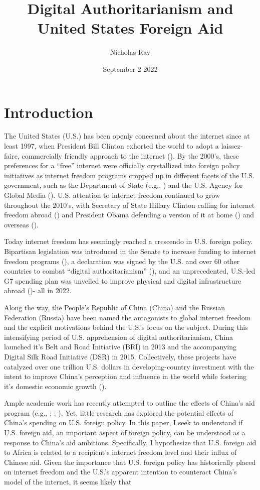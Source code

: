\documentclass{article}
\title{\vspace{-2cm}Digital Authoritarianism and United States Foreign Aid\vspace{-0.5cm}}
\author{Nicholas Ray}
\date{\vspace{-0.5cm}September 2 2022\vspace{-1cm}}
\begin{document}
\maketitle
\section*{Introduction}
The United States (U.S.) has been openly concerned about the internet since at least 1997, when President Bill Clinton exhorted the world to adopt a laissez-faire, commercially friendly approach to the internet (\cite{government1997}). By the 2000's, these preferences for a ``free'' internet were officially crystallized into foreign policy initiatives as internet freedom programs cropped up in different facets of the U.S. government, such as the Department of State (e.g., \cite{government2021}) and the U.S. Agency for Global Media (\cite{government2022d}). U.S. attention to internet freedom continued to grow throughout the 2010's, with Secretary of State Hillary Clinton calling for internet freedom abroad (\cite{government2010}) and President Obama defending a version of it at home (\cite{government2016}) and overseas (\cite{richburg2009}).

Today internet freedom has seemingly reached a crescendo in U.S. foreign policy. Bipartisan legislation was introduced in the Senate to increase funding to internet freedom programs (\cite{government2022a}), a declaration was signed by the U.S. and over 60 other countries to combat ``digital authoritarianism'' (\cite{government2022b}), and an unprecedented, U.S.-led G7 spending plan was unveiled to improve physical and digital infrastructure abroad (\cite{government2022c})- all in 2022. 

Along the way, the People's Republic of China (China) and the Russian Federation (Russia) have been named the antagonists to global internet freedom and the explicit motivations behind the U.S.'s focus on the subject. During this intensifying period of U.S. apprehension of digital authoritarianism, China launched it's Belt and Road Initiative (BRI) in 2013 and the accompanying Digital Silk Road Initiative (DSR) in 2015. Collectively, these projects have catalyzed over one trillion U.S. dollars in developing-country investment with the intent to improve China's perception and influence in the world while fostering it's domestic economic growth (\cite{dreher2022}).

Ample academic work has recently attempted to outline the effects of China's aid program (e.g., \cite{gehring2022}; \cite{dreher2018}; \cite{blair2021}). Yet, little research has explored the potential effects of China's spending on U.S. foreign policy. In this paper, I seek to understand if U.S. foreign aid, an important aspect of foreign policy, can be understood as a response to China's aid ambitions. Specifically, I hypothesize that U.S. foreign aid to Africa is related to a recipient's internet freedom level and their influx of Chinese aid. Given the importance that U.S. foreign policy has historically placed on internet freedom and the U.S.'s apparent intention to counteract China's model of the internet, it seems likely that 
\end{document}

